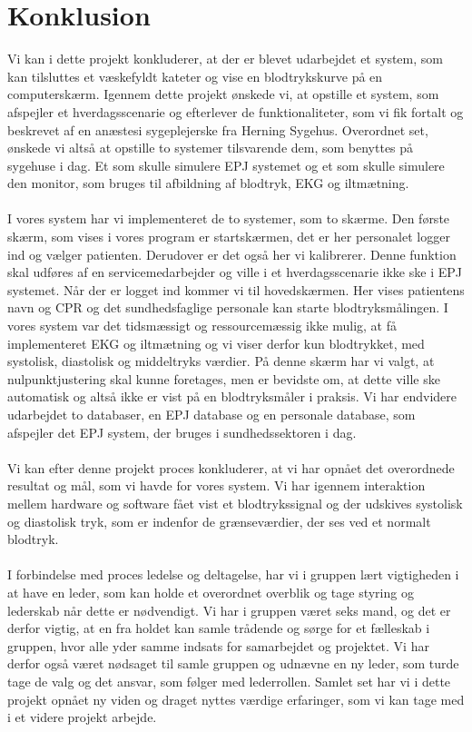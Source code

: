 \chapter{Konklusion}
Vi kan i dette projekt konkluderer, at der er blevet udarbejdet et system, som kan tilsluttes et væskefyldt kateter og vise en blodtrykskurve på en computerskærm. Igennem dette projekt ønskede vi, at opstille et system, som afspejler et hverdagsscenarie og efterlever de funktionaliteter, som vi fik fortalt og beskrevet af en anæstesi sygeplejerske fra Herning Sygehus. Overordnet set, ønskede vi altså at opstille to systemer tilsvarende dem, som benyttes på sygehuse i dag. Et som skulle simulere EPJ systemet og et som skulle simulere den monitor, som bruges til afbildning af blodtryk, EKG og iltmætning. \\
\\
I vores system har vi implementeret de to systemer, som to skærme. Den første skærm, som vises i vores program er startskærmen, det er her personalet logger ind og vælger patienten. Derudover er det også her vi kalibrerer. Denne funktion skal udføres af en servicemedarbejder og ville i et hverdagsscenarie ikke ske i EPJ systemet. Når der er logget ind kommer vi til hovedskærmen. Her vises patientens navn og CPR og det sundhedsfaglige personale kan starte blodtryksmålingen. I vores system var det tidsmæssigt og ressourcemæssig ikke mulig, at få implementeret EKG og iltmætning og vi viser derfor kun blodtrykket, med systolisk, diastolisk og middeltryks værdier. På denne skærm har vi valgt, at nulpunktjustering skal kunne foretages, men er bevidste om, at dette ville ske automatisk og altså ikke er vist på en blodtryksmåler i praksis.  Vi har endvidere udarbejdet to databaser, en EPJ database og en personale database, som afspejler det EPJ system, der bruges i sundhedssektoren i dag. \\
\\
Vi kan efter denne projekt proces konkluderer, at vi har opnået det overordnede resultat og mål, som vi havde for vores system. Vi har igennem interaktion mellem hardware og software fået vist et blodtrykssignal og der udskives systolisk og diastolisk tryk, som er indenfor de grænseværdier, der ses ved et normalt blodtryk. \\
\\
I forbindelse med proces ledelse og deltagelse, har vi i gruppen lært vigtigheden i at have en leder, som kan holde et overordnet overblik og tage styring og lederskab når dette er nødvendigt. Vi har i gruppen været seks mand, og det er derfor vigtig, at en fra holdet kan samle trådende og sørge for et fælleskab i gruppen, hvor alle yder samme indsats for samarbejdet og projektet. Vi har derfor også været nødsaget til samle gruppen og udnævne en ny leder, som turde tage de valg og det ansvar, som følger med lederrollen. Samlet set har vi i dette projekt opnået ny viden og draget nyttes værdige erfaringer, som vi kan tage med i et videre projekt arbejde. 
